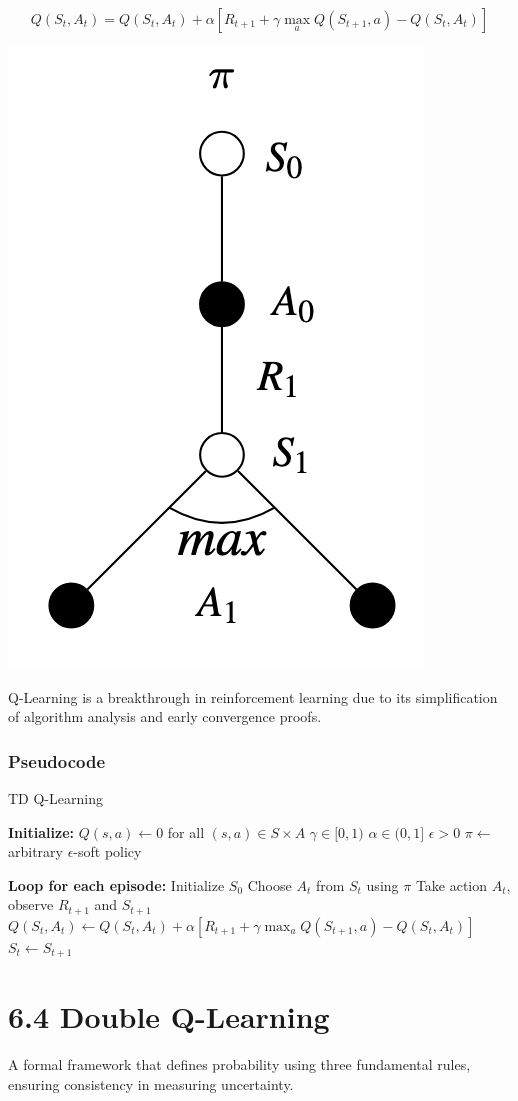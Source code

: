 \documentclass[
  letterpaper,
  DIV=11,
  numbers=noendperiod]{scrreprt}
\begin{document}
\[
Q(S_{t},A_{t}) = Q(S_{t},A_{t}) + \alpha [ R_{t+1} + \gamma \max_{a} Q(S_{t+1},a) - Q(S_{t},A_{t})]
\]

\begin{center}
\includegraphics[width=0.22\linewidth,height=\textheight,keepaspectratio]{lecture6/images/Q-Learning.png}
\end{center}

Q-Learning is a breakthrough in reinforcement learning due to its
simplification of algorithm analysis and early convergence proofs.

\subsection{Pseudocode}\label{pseudocode-11}

\begin{algorithm}[htb!]
\caption{TD Q-Learning}
\begin{algorithmic}[1]
\State \textbf{Initialize:} 
\State $Q(s, a) \gets 0$ for all $(s, a) \in S \times A$
\State $\gamma \in [0, 1)$
\State $\alpha \in (0, 1]$
\State $\epsilon > 0$
\State $\pi \gets$ arbitrary $\epsilon$-soft policy

\State \textbf{Loop for each episode:}
\State Initialize $S_{0}$
\Repeat
    \State Choose $A_{t}$ from $S_{t}$ using $\pi$
    \State Take action $A_{t}$, observe $R_{t+1}$ and $S_{t+1}$
    \State $Q(S_{t}, A_{t}) \gets Q(S_{t}, A_{t}) + \alpha \left[R_{t+1} + \gamma \max_{a} Q(S_{t+1}, a) - Q(S_{t}, A_{t})\right]$
    \State $S_{t} \gets S_{t+1}$

\end{algorithmic}
\end{algorithm}

\chapter{6.4 Double Q-Learning}\label{double-q-learning}

\begin{tcolorbox}[enhanced jigsaw, colback=white, left=2mm, breakable, opacityback=0, bottomrule=.15mm, rightrule=.15mm, arc=.35mm, colframe=quarto-callout-note-color-frame, leftrule=.75mm, toprule=.15mm]

A formal framework that defines probability using three fundamental
rules, ensuring consistency in measuring uncertainty. 🎲

\end{tcolorbox}
\end{document}

